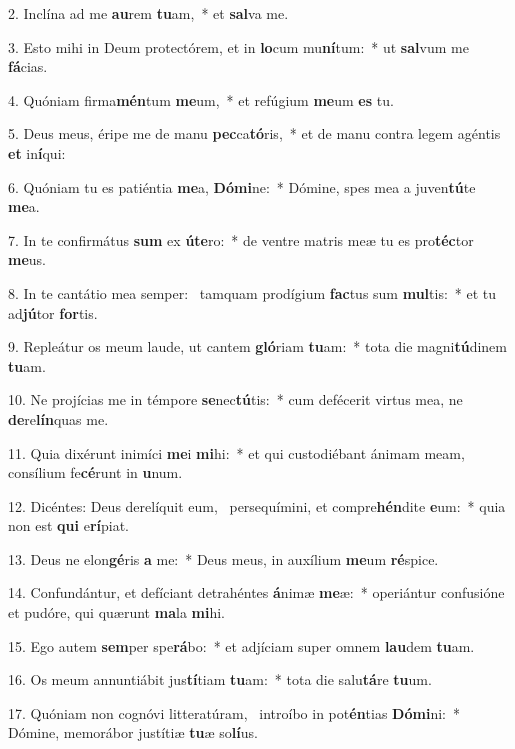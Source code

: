 2. Inclína ad me \textbf{au}rem \textbf{tu}am,~*  et \textbf{sal}va me.\

3. Esto mihi in Deum protectórem, et in \textbf{lo}cum mu\textbf{ní}tum:~*  ut \textbf{sal}vum me \textbf{fá}cias.\

4. Quóniam firma\textbf{mén}tum \textbf{me}um,~*  et refúgium \textbf{me}um \textbf{es} tu.\

5. Deus meus, éripe me de manu \textbf{pec}ca\textbf{tó}ris,~*  et de manu contra legem agéntis \textbf{et} in\textbf{í}qui:\

6. Quóniam tu es patiéntia \textbf{me}a, \textbf{Dó}\textbf{mi}ne:~*  Dómine, spes mea a juven\textbf{tú}te \textbf{me}a.\

7. In te confirmátus \textbf{sum} ex \textbf{ú}\textbf{te}ro:~*  de ventre matris meæ tu es pro\textbf{téc}tor \textbf{me}us.\

8. In te cantátio mea semper: \dag\  tamquam prodígium \textbf{fac}tus sum \textbf{mul}tis:~*  et tu ad\textbf{jú}tor \textbf{for}tis.\

9. Repleátur os meum laude, ut cantem \textbf{gló}riam \textbf{tu}am:~*  tota die magni\textbf{tú}dinem \textbf{tu}am.\

10. Ne projícias me in témpore \textbf{se}nec\textbf{tú}tis:~*  cum defécerit virtus mea, ne \textbf{de}re\textbf{lín}quas me.\

11. Quia dixérunt inimíci \textbf{me}i \textbf{mi}hi:~*  et qui custodiébant ánimam meam, consílium fe\textbf{cé}runt in \textbf{u}num.\

12. Dicéntes: Deus derelíquit eum, \dag\  persequímini, et compre\textbf{hén}dite \textbf{e}um:~*  quia non est \textbf{qui} e\textbf{rí}piat.\

13. Deus ne elon\textbf{gé}ris \textbf{a} me:~*  Deus meus, in auxílium \textbf{me}um \textbf{ré}spice.\

14. Confundántur, et defíciant detrahéntes \textbf{á}nimæ \textbf{me}æ:~*  operiántur confusióne et pudóre, qui quærunt \textbf{ma}la \textbf{mi}hi.\

15. Ego autem \textbf{sem}per spe\textbf{rá}bo:~*  et adjíciam super omnem \textbf{lau}dem \textbf{tu}am.\

16. Os meum annuntiábit jus\textbf{tí}tiam \textbf{tu}am:~*  tota die salu\textbf{tá}re \textbf{tu}um.\

17. Quóniam non cognóvi litteratúram, \dag\  introíbo in pot\textbf{én}tias \textbf{Dó}\textbf{mi}ni:~*  Dómine, memorábor justítiæ \textbf{tu}æ so\textbf{lí}us.\

